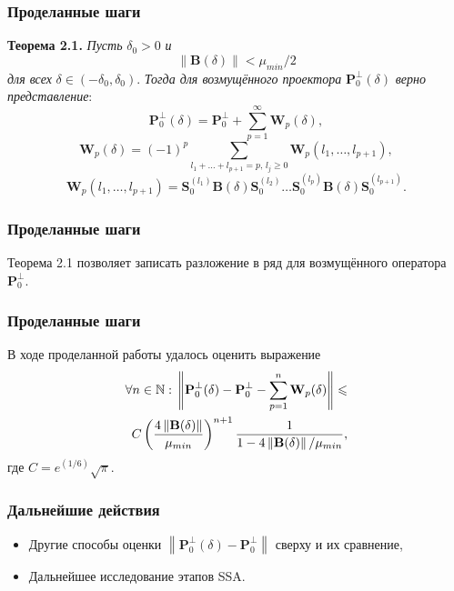 \documentclass[pdf, notheorems, hyperref={bookmarks=false}, handout]{beamer}
\newcommand\norm[1]{\left\|#1\right\|}
\begin{document}
	\begin{frame}\frametitle{Проделанные шаги}
		{\bf Теорема 2.1.\cite{nekrutkin2010perturbation} }\emph{Пусть} $\delta_0>0$ \emph{и} 
		\begin{equation}\label{eq:2.1}
			\norm{\textbf{B}(\delta)}<\mu_{min}/2
		\end{equation}
		\emph{для всех }$\delta\in(-\delta_0,\delta_0)$. \emph{Тогда для возмущённого проектора} $\textbf{P}_0^\bot(\delta)$ \emph{верно представление}:
		\begin{equation}\label{eq:2.2}
			\textbf{P}_0^\bot(\delta)=\textbf{P}_0^\bot + \sum_{p=1}^\infty\textbf{W}_p(\delta),
		\end{equation}
		\begin{equation*}
			\textbf{W}_p(\delta) = (-1)^p\sum\limits_{l_1+\dots+l_{p+1}=p,\,l_j\geqslant0}\textbf{W}_p(l_1,\dots,l_{p+1}),
		\end{equation*}
		\begin{equation*}
			\textbf{W}_p(l_1,\dots,l_{p+1}) = \textbf{S}_0^{(l_1)}\textbf{B}(\delta)\textbf{S}_0^{(l_2)}\dots\textbf{S}_0^{(l_p)}\textbf{B}(\delta)\textbf{S}_0^{(l_{p+1})}.
		\end{equation*}
	\end{frame}
	\begin{frame}\frametitle{Проделанные шаги}
		Теорема 2.1 позволяет записать разложение в ряд для возмущённого оператора $\textbf{P}_0^\bot$.
	\end{frame}
	\begin{frame}\frametitle{Проделанные шаги}
		В ходе проделанной работы удалось оценить выражение
		\begin{align}
			\forall n\in\mathbb{N}:\,\norm{\textbf{P}_0^\bot(\delta) - \textbf{P}_0^\bot - \sum^n_{p=1}\textbf{W}_p(\delta)} \leqslant\notag\\ C\left(\dfrac{4\norm{\textbf{B}(\delta)}}{\mu_{min}}\right)^{n+1}\dfrac{1}{1-4\norm{\textbf{B}(\delta)}/\mu_{min}},\label{eq:1}
		\end{align}
		где $C = e^{(1/6)}\sqrt{\pi}$.
	\end{frame}
	\begin{frame}\frametitle{Дальнейшие действия}
		\begin{itemize}
			\item Другие способы оценки  $\norm{\textbf{P}_0^\bot(\delta) - \textbf{P}_0^\bot}$ сверху и их сравнение,
			\item Дальнейшее исследование этапов SSA.
		\end{itemize}
	\end{frame}
	
	
	
	
\end{document}
